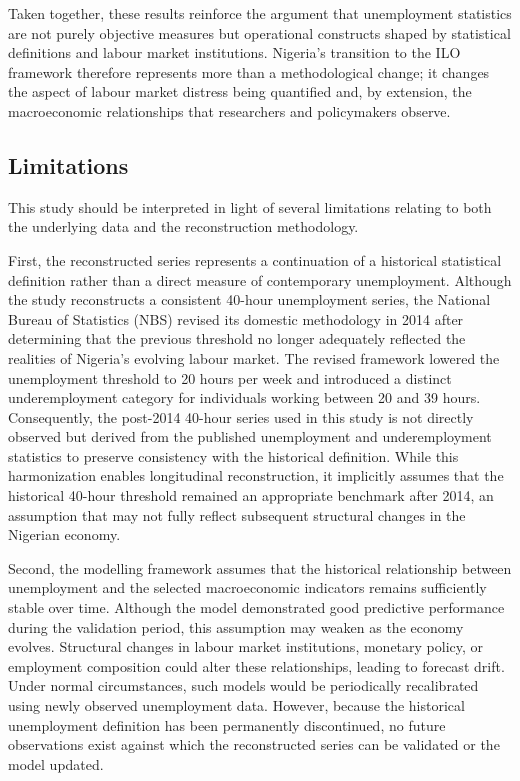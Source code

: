 \documentclass[
  letterpaper,
  DIV=11,
  numbers=noendperiod]{scrartcl}
\begin{document}
Taken together, these results reinforce the argument that unemployment
statistics are not purely objective measures but operational constructs
shaped by statistical definitions and labour market institutions.
Nigeria's transition to the ILO framework therefore represents more than
a methodological change; it changes the aspect of labour market distress
being quantified and, by extension, the macroeconomic relationships that
researchers and policymakers observe.

\subsection{Limitations}\label{limitations}

This study should be interpreted in light of several limitations
relating to both the underlying data and the reconstruction methodology.

First, the reconstructed series represents a continuation of a
historical statistical definition rather than a direct measure of
contemporary unemployment. Although the study reconstructs a consistent
40-hour unemployment series, the National Bureau of Statistics (NBS)
revised its domestic methodology in 2014 after determining that the
previous threshold no longer adequately reflected the realities of
Nigeria's evolving labour market. The revised framework lowered the
unemployment threshold to 20 hours per week and introduced a distinct
underemployment category for individuals working between 20 and 39
hours. Consequently, the post-2014 40-hour series used in this study is
not directly observed but derived from the published unemployment and
underemployment statistics to preserve consistency with the historical
definition. While this harmonization enables longitudinal
reconstruction, it implicitly assumes that the historical 40-hour
threshold remained an appropriate benchmark after 2014, an assumption
that may not fully reflect subsequent structural changes in the Nigerian
economy.

Second, the modelling framework assumes that the historical relationship
between unemployment and the selected macroeconomic indicators remains
sufficiently stable over time. Although the model demonstrated good
predictive performance during the validation period, this assumption may
weaken as the economy evolves. Structural changes in labour market
institutions, monetary policy, or employment composition could alter
these relationships, leading to forecast drift. Under normal
circumstances, such models would be periodically recalibrated using
newly observed unemployment data. However, because the historical
unemployment definition has been permanently discontinued, no future
observations exist against which the reconstructed series can be
validated or the model updated.
\end{document}
